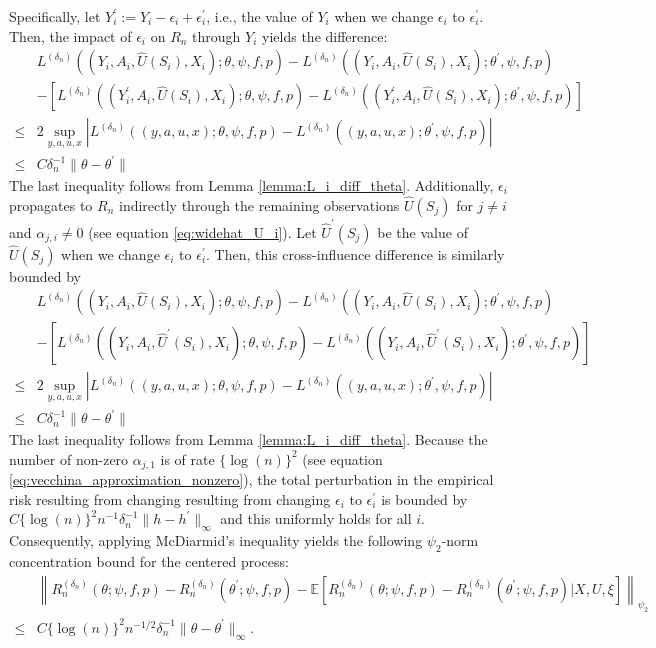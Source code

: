 \documentclass[12pt]{article}
\newcommand{\E}{\mathbb{E}}
\begin{document}
Specifically, let $Y_i^\prime:= Y_i - \epsilon_i + \epsilon_i^\prime$, i.e., the value of $Y_i$ when we change $\epsilon_i$ to $\epsilon_i^\prime$. Then, the impact of $\epsilon_i$ on $R_n$ through $Y_i$ yields the difference:
\begin{align*}
&L^{(\delta_n)}((Y_i,A_i,\widehat U(S_i),X_i);\theta,\psi,f,p) - L^{(\delta_n)}((Y_i,A_i,\widehat U(S_i),X_i);\theta^\prime,\psi,f,p)\\
        & -\left[L^{(\delta_n)}((Y_i^\prime,A_i,\widehat U(S_i),X_i);\theta,\psi,f,p) - L^{(\delta_n)}((Y_i^\prime,A_i,\widehat U(S_i),X_i);\theta^\prime,\psi,f,p)\right]\\
        \leq  & 2\sup_{y,a,u,x}\left|L^{(\delta_n)}((y,a,u,x);\theta,\psi,f,p) - L^{(\delta_n)}((y,a,u,x);\theta^\prime,\psi,f,p)\right|\\
        \leq & C\delta_n^{-1}\|\theta-\theta^\prime\|
\end{align*}
The last inequality follows from Lemma \ref{lemma:L_i_diff_theta}.
Additionally, $\epsilon_i$ propagates to $R_n$ indirectly through the remaining observations $\widehat U(S_j)$ for $j\neq i$ and $\alpha_{j,i}\neq 0$ (see equation \eqref{eq:widehat_U_i}). Let $\widehat U^\prime(S_j)$ be the value of $\widehat U(S_j)$ when we change $\epsilon_i$ to $\epsilon_i^\prime$. Then, this cross-influence difference is similarly bounded by 
\begin{align*}
&L^{(\delta_n)}((Y_i,A_i,\widehat U(S_i),X_i);\theta,\psi,f,p) - L^{(\delta_n)}((Y_i,A_i,\widehat U(S_i),X_i);\theta^\prime,\psi,f,p)\\
        & -\left[L^{(\delta_n)}((Y_i,A_i,\widehat U^\prime(S_i),X_i);\theta,\psi,f,p) - L^{(\delta_n)}((Y_i,A_i,\widehat U^\prime(S_i),X_i);\theta^\prime,\psi,f,p)\right]\\
        \leq  & 2\sup_{y,a,u,x}\left|L^{(\delta_n)}((y,a,u,x);\theta,\psi,f,p) - L^{(\delta_n)}((y,a,u,x);\theta^\prime,\psi,f,p)\right|\\
        \leq & C\delta_n^{-1}\|\theta-\theta^\prime\|
\end{align*}
The last inequality follows from Lemma \ref{lemma:L_i_diff_theta}. Because the number of non-zero $\alpha_{j,1}$ is of rate $\{\log(n)\}^2$ (see equation \eqref{eq:vecchina_approximation_nonzero}), the total perturbation in the empirical risk resulting from changing resulting from changing $\epsilon_i$ to $\epsilon_i^\prime$ is bounded by $C\{\log(n)\}^2 n^{-1}\delta_n^{-1}\|h - h^\prime\|_{\infty}$ and this uniformly holds for all $i$. Consequently, applying McDiarmid's inequality yields the following $\psi_2$-norm concentration bound for the centered process:
\begin{align*}
    &\left\|R_n^{(\delta_n)}(\theta;\psi,f,p)-R_n^{({\delta_n})}(\theta^\prime;\psi,f,p)-\E\left[R_n^{(\delta_n)}(\theta;\psi,f,p)-R_n^{({\delta_n})}(\theta^\prime;\psi,f,p)|X,U,\xi\right]\right\|_{\psi_2}\\
    \leq & C\{\log(n)\}^2 n^{-1/2}\delta_n^{-1}\|\theta - \theta^\prime\|_{\infty}.
\end{align*}
\end{document}
